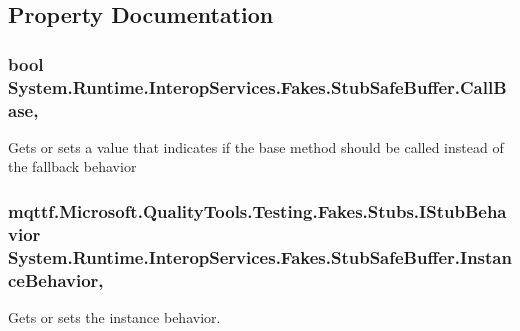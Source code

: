 \subsection{Property Documentation}
\hypertarget{class_system_1_1_runtime_1_1_interop_services_1_1_fakes_1_1_stub_safe_buffer_a8343f222974f734bca911a55c601781b}{
\subsubsection[{Call\-Base}]{\setlength{\rightskip}{0pt plus 5cm}bool System.\-Runtime.\-Interop\-Services.\-Fakes.\-Stub\-Safe\-Buffer.\-Call\-Base\hspace{0.3cm}{\ttfamily [get]}, {\ttfamily [set]}}}\label{class_system_1_1_runtime_1_1_interop_services_1_1_fakes_1_1_stub_safe_buffer_a8343f222974f734bca911a55c601781b}


Gets or sets a value that indicates if the base method should be called instead of the fallback behavior

\hypertarget{class_system_1_1_runtime_1_1_interop_services_1_1_fakes_1_1_stub_safe_buffer_aacfdc2f5d84af6154b05ea904d74755a}{
\subsubsection[{Instance\-Behavior}]{\setlength{\rightskip}{0pt plus 5cm}mqttf.\-Microsoft.\-Quality\-Tools.\-Testing.\-Fakes.\-Stubs.\-I\-Stub\-Behavior System.\-Runtime.\-Interop\-Services.\-Fakes.\-Stub\-Safe\-Buffer.\-Instance\-Behavior\hspace{0.3cm}{\ttfamily [get]}, {\ttfamily [set]}}}\label{class_system_1_1_runtime_1_1_interop_services_1_1_fakes_1_1_stub_safe_buffer_aacfdc2f5d84af6154b05ea904d74755a}


Gets or sets the instance behavior.

